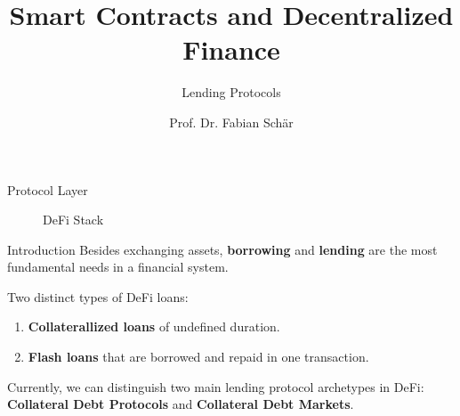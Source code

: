 \documentclass[]{beamer}
\title{Smart Contracts and Decentralized Finance}
\subtitle{Lending Protocols}
\author{Prof. Dr. Fabian Schär}
\institute{University of Basel}
\begin{document}
\thispagestyle{empty}
\begin{frame}[noframenumbering]
	\titlepage
\end{frame}

\begin{frame}{Protocol Layer}

\begin{figure}[t]
	\centering
	\resizebox{0.9\textwidth}{!}{
	\begin{tikzpicture}[scale=1.0, every node/.style={scale=1.0}]
		
	\end{tikzpicture}}
	\caption{DeFi Stack \cite{FS:21}}
\end{figure}
	
\end{frame}


\begin{frame}{Introduction}
Besides exchanging assets, \textbf{borrowing} and \textbf{lending} are the most fundamental needs in a financial system. \\

\vspace{1em}

 {
Two distinct types of DeFi loans:
\vspace{0.5em}
\begin{enumerate}
  \item \textbf{Collaterallized loans} of undefined duration.
  \item \textbf{Flash loans} that are borrowed and repaid in one transaction. 
\end{enumerate} 
}

 {
\vspace{1em}
Currently, we can distinguish two main lending protocol archetypes in DeFi: \textbf{Collateral Debt Protocols} and \textbf{Collateral Debt Markets}.
}
	
	
\end{frame}
\end{document}
